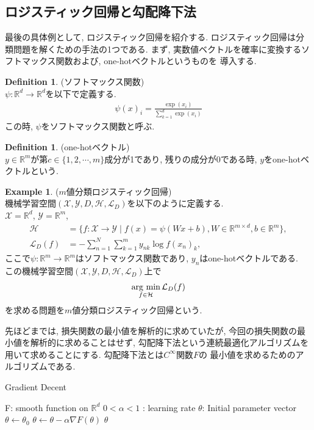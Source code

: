 \documentclass[11pt, a4paper, dvipdfmx]{jsarticle}
\theoremstyle{definition}
\newtheorem{Definition+}[Axiom+]{Definition}
\newtheorem{Example+}[Axiom+]{Example}
\newcommand{\R}{\mathbb{R}}
\newcommand{\X}{\mathcal{X}}
\newcommand{\Y}{\mathcal{Y}}
\newcommand{\Hil}{\mathcal{H}}
\newcommand{\Loss}{\mathcal{L}_{D}}
\newcommand{\MLsp}{(\X, \Y, D, \Hil, \Loss)}
\newcommand{\argmin}{\mathop{\rm arg~min}\limits}
\begin{document}
\subsection{ロジスティック回帰と勾配降下法}
最後の具体例として, ロジスティック回帰を紹介する. 
ロジスティック回帰は分類問題を解くための手法の1つである.
まず, 実数値ベクトルを確率に変換するソフトマックス関数および, one-hotベクトルというものを
導入する. 
\begin{Definition+}(ソフトマックス関数)\\
    $\psi:\R^d\to\R^d$を以下で定義する.
    \begin{align*}
        \psi(x)_{i} = \frac{\exp(x_i)}{\sum_{k = 1}^d\exp(x_i)}
    \end{align*}
    この時, $\psi$をソフトマックス関数と呼ぶ.
\end{Definition+}
\begin{Definition+}(one-hotベクトル)\\
    $y\in\R^m$が第$c\in\{1, 2, \cdots, m\}$成分が1であり, 残りの成分が0である時, 
    $y$をone-hotベクトルという.
\end{Definition+}
\begin{Example+}($m$値分類ロジスティック回帰)\\
    機械学習空間$\MLsp$を以下のように定義する.\\
    $\X=\R^d$, $\Y = \R^m$, 
    \begin{align*}
        \Hil &= \{f:\X\to\Y\mid f(x) = \psi(Wx + b), W\in\R^{m\times d}, b\in\R^m\},\\
        \Loss(f) &= -\sum_{n = 1}^{N}\sum_{k = 1}^{m}y_{nk}\log f(x_n)_{k},
    \end{align*}
    ここで$\psi:\R^m\to\R^m$はソフトマックス関数であり, $y_{n}$はone-hotベクトルである.\\
    この機械学習空間$\MLsp$上で
    \begin{align*}
        \argmin_{f\in\Hil}\Loss(f)
    \end{align*}
    を求める問題を$m$値分類ロジスティック回帰という.
\end{Example+}
先ほどまでは, 損失関数の最小値を解析的に求めていたが, 今回の損失関数の最小値を解析的に求めることはせず,
勾配降下法という連続最適化アルゴリズムを用いて求めることにする. 勾配降下法とは$C^{\infty}$関数$F$の
最小値を求めるためのアルゴリズムである.
\begin{algorithm}[H]
    \caption{Gradient Decent}
    \begin{algorithmic}
        \REQUIRE F: smooth function on $\R^{d}$
        \REQUIRE $0<\alpha<1$ : learning rate 
        \REQUIRE $\theta$: Initial parameter vector
        \STATE $\theta\leftarrow\theta_{0}$
        \STATE $\theta\leftarrow\theta - \alpha\nabla F(\theta)$ 
        \ENDWHILE
        \RETURN $\theta$
    \end{algorithmic}
\end{algorithm}
\end{document}
